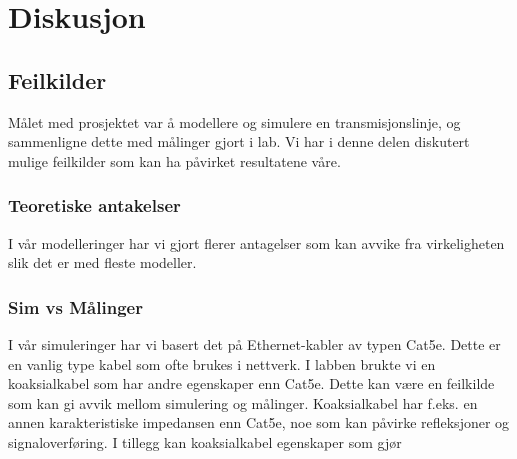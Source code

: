 \section{Diskusjon}
\subsection{Feilkilder}
Målet med prosjektet var å modellere og simulere en transmisjonslinje, og sammenligne dette med målinger gjort i lab. Vi har i denne delen diskutert mulige feilkilder som kan ha påvirket resultatene våre.
\subsubsection{Teoretiske antakelser}
I vår modelleringer har vi gjort flerer antagelser som kan avvike fra virkeligheten slik det er med fleste modeller. 
\subsubsection{Sim vs Målinger}
I vår simuleringer har vi basert det på Ethernet-kabler av typen Cat5e. Dette er en vanlig type kabel som ofte brukes i nettverk. I labben brukte vi en koaksialkabel som har andre egenskaper enn Cat5e. Dette kan være en feilkilde som kan gi avvik mellom simulering og målinger. Koaksialkabel har f.eks. en annen karakteristiske impedansen enn Cat5e, noe som kan påvirke refleksjoner og signaloverføring. I tillegg kan koaksialkabel egenskaper som gjør 